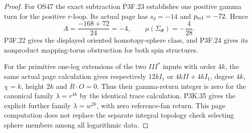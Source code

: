 \begin{proof}
For OS47 the exact subtraction P3F.23 establishes one positive gamma turn for the positive \(r\)-loop. Its actual page has \(s_\delta=-14\) and \(p_{\rm rel}=-72\). Hence \[
 A=\frac{-168+72}{24}=-4,
 \qquad\mu(\Sigma_\Phi)=-\frac4{28}.
\] P3F.22 gives the displayed oriented homotopy-sphere class, and P3F.24 gives its nonproduct mapping-torus obstruction for both spin structures.

For the primitive one-log extensions of the two \(III^*\) inputs with order \(4k\), the same actual page calculation gives respectively \(12kI_1\) or \(4kII+4kI_1\), degree \(4k\), \(\chi=k\), height \(2k\) and \(R\cdot O=0\). Thus their gamma-return integer is zero for the canonical family \(\lambda=r^{4k}\) by the identical trace calculation. P3K.35 gives the explicit further family \(\lambda=w^{2k}\), with zero reference-fan return. This page computation does not replace the separate integral topology check selecting sphere members among all logarithmic data.
\end{proof}
